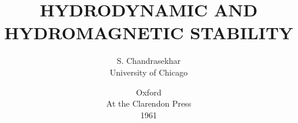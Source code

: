 

\title{\textbf{HYDRODYNAMIC AND HYDROMAGNETIC STABILITY}}
\author{S. Chandrasekhar\\University of Chicago}
\date{Oxford\\At the Clarendon Press\\1961}



\maketitle



\tableofcontents



















\appendix













